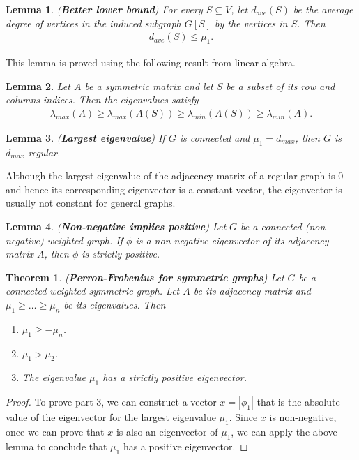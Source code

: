 \documentclass[]{article}
\newtheorem{theorem}{Theorem}[section]
\newtheorem{lemma}{Lemma}[section]
\begin{document}
	\begin{lemma}(\textbf{Better lower bound})
		For every $S \subseteq V$, let $d_{ave}(S)$ be the average degree of vertices in the induced subgraph $G[S]$ by the vertices in $S$. Then 
		\begin{align*}
		d_{ave}(S) \le \mu_1.
		\end{align*}
	\end{lemma}
	This lemma is proved using the following result from linear algebra. 
	
	\begin{lemma}
		Let $A$ be a symmetric matrix and let $S$ be a subset of its row and columns indices. Then the eigenvalues satisfy  
		\begin{align*}
		\lambda_{max}(A) \ge \lambda_{max}(A(S)) \ge \lambda_{min}(A(S)) \ge \lambda_{min}(A).
		\end{align*}
	\end{lemma}
	
	\begin{lemma} (\textbf{Largest eigenvalue})
		If $G$ is connected and $\mu_1=d_{max}$, then $G$ is $d_{max}$-regular.
	\end{lemma}
	
	Although the largest eigenvalue of the adjacency matrix of a regular graph is 0 and hence its corresponding eigenvector is a constant vector, the eigenvector is usually not constant for general graphs. 
	
	
	\begin{lemma} (\textbf{Non-negative implies positive})
		Let $G$ be a connected (non-negative) weighted graph. If $\phi$ is a non-negative eigenvector of its adjacency matrix $A$, then $\phi$ is strictly positive. 
	\end{lemma}
	
	\begin{theorem} (\textbf{Perron-Frobenius for symmetric graphs})
		Let $G$ be a connected weighted symmetric graph. Let $A$ be its adjacency matrix and $\mu_1 \ge \dots \ge \mu_n$ be its eigenvalues. Then 
		\begin{enumerate}
			\item $\mu_1 \ge -\mu_n$.
			\item $\mu_1 > \mu_2$.
			\item The eigenvalue $\mu_1$ has a strictly positive eigenvector.
		\end{enumerate}
	\end{theorem}
	
	\begin{proof}
		To prove part 3, we can construct a vector $x = |\phi_1|$ that is the absolute value of the eigenvector for the largest eigenvalue $\mu_1$. Since $x$ is non-negative, once we can prove that $x$ is also an eigenvector of $\mu_1$, we can apply the above lemma to conclude that $\mu_1$ has a positive eigenvector. 
	\end{proof}
	
\end{document}

